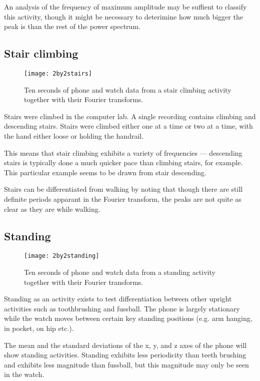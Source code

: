       An analysis of the frequency of maximum amplitude may be suffient to classify this activity, though it might be necessary to deterimine how much bigger the peak is than the rest of the power spectrum.
      
    \pagebreak[4]
    \subsection{Stair climbing}
      \begin{figure}[!th]
        \centering
        \texttt{[image: 2by2stairs]}
        \caption{Ten seconds of phone and watch data from a stair climbing activity together with their Fourier transforms.}
        \label{fig:2by2stairs}
      \end{figure}
      Stairs were climbed in the computer lab. A single recording contains climbing and descending stairs. Stairs were climbed either one at a time or two at a time, with the hand either loose or holding the handrail.
      
      This means that stair climbing exhibits a variety of frequencies --- descending stairs is typically done a much quicker pace than climbing stairs, for example. This particular example seems to be drawn from stair descending.
      
      Stairs can be differentiated from walking by noting that though there are still definite periods apparant in the Fourier transform, the peaks are not quite as clear as they are while walking.
    \pagebreak[4]
    \subsection{Standing}
      \begin{figure}[!th]
        \centering
        \texttt{[image: 2by2standing]}
        \caption{Ten seconds of phone and watch data from a standing activity together with their Fourier transforms.}
        \label{fig:2by2standing}
      \end{figure}
      Standing as an activity exists to test differentiation between other upright activities such as toothbrushing and fussball. The phone is largely stationary while the watch moves between certain key standing positions (e.g. arm hanging, in pocket, on hip etc.). 
      
      The mean and the standard deviations of the x, y, and z axes of the phone will show standing activities. Standing exhibits less periodicity than teeth brushing and exhibits less magnitude than fussball, but this magnitude may only be seen in the watch.
    \pagebreak[4]
